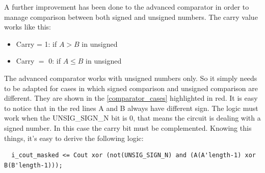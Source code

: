  

A further improvement has been done to the advanced comparator in order to manage comparison between both signed and unsigned numbers. The carry value works like this:
\begin{itemize}
  \item Carry = 1: if \(A > B\) in unsigned
  \item Carry \(=\) 0: if \(A \leq B\) in unsigned
\end{itemize}

The advanced comparator works with unsigned numbers only. So it simply needs to be adapted for cases in which signed comparison and unsigned comparison are different. They are shown in the \autoref{comparator_cases} highlighted in red. 
It is easy to notice that in the red lines A and B always have different sign. The logic must work when the UNSIG\_SIGN\_N bit is 0, that means the circuit is dealing with a signed number. In this case the carry bit must be complemented. Knowing this things, it's easy to derive the following logic:

\begin{verbatim}
  i_cout_masked <= Cout xor (not(UNSIG_SIGN_N) and (A(A'length-1) xor B(B'length-1)));
\end{verbatim}

